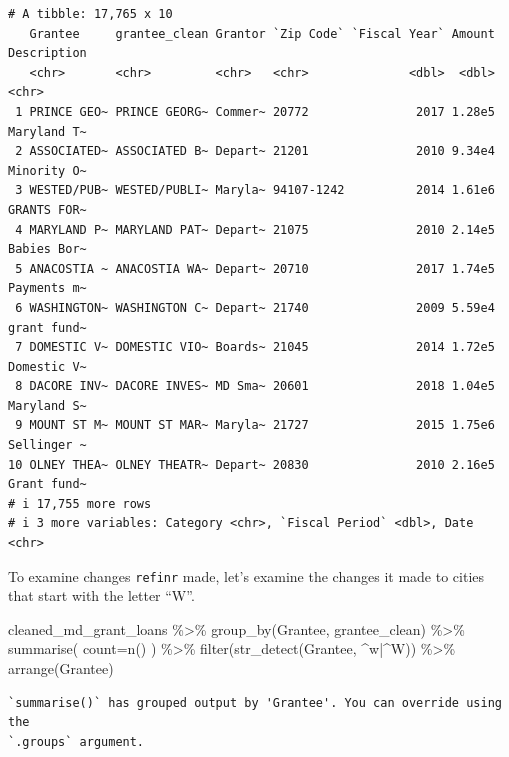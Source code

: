 \documentclass[
  letterpaper,
  DIV=11,
  numbers=noendperiod]{scrreprt}
\newenvironment{Shaded}{\begin{snugshade}}{\end{snugshade}}
\newcommand{\AttributeTok}[1]{\textcolor[rgb]{0.40,0.45,0.13}{#1}}
\newcommand{\FunctionTok}[1]{\textcolor[rgb]{0.28,0.35,0.67}{#1}}
\newcommand{\NormalTok}[1]{\textcolor[rgb]{0.00,0.23,0.31}{#1}}
\newcommand{\SpecialCharTok}[1]{\textcolor[rgb]{0.37,0.37,0.37}{#1}}
\newcommand{\StringTok}[1]{\textcolor[rgb]{0.13,0.47,0.30}{#1}}
\begin{document}
\begin{verbatim}
# A tibble: 17,765 x 10
   Grantee     grantee_clean Grantor `Zip Code` `Fiscal Year` Amount Description
   <chr>       <chr>         <chr>   <chr>              <dbl>  <dbl> <chr>      
 1 PRINCE GEO~ PRINCE GEORG~ Commer~ 20772               2017 1.28e5 Maryland T~
 2 ASSOCIATED~ ASSOCIATED B~ Depart~ 21201               2010 9.34e4 Minority O~
 3 WESTED/PUB~ WESTED/PUBLI~ Maryla~ 94107-1242          2014 1.61e6 GRANTS FOR~
 4 MARYLAND P~ MARYLAND PAT~ Depart~ 21075               2010 2.14e5 Babies Bor~
 5 ANACOSTIA ~ ANACOSTIA WA~ Depart~ 20710               2017 1.74e5 Payments m~
 6 WASHINGTON~ WASHINGTON C~ Depart~ 21740               2009 5.59e4 grant fund~
 7 DOMESTIC V~ DOMESTIC VIO~ Boards~ 21045               2014 1.72e5 Domestic V~
 8 DACORE INV~ DACORE INVES~ MD Sma~ 20601               2018 1.04e5 Maryland S~
 9 MOUNT ST M~ MOUNT ST MAR~ Maryla~ 21727               2015 1.75e6 Sellinger ~
10 OLNEY THEA~ OLNEY THEATR~ Depart~ 20830               2010 2.16e5 Grant fund~
# i 17,755 more rows
# i 3 more variables: Category <chr>, `Fiscal Period` <dbl>, Date <chr>
\end{verbatim}

To examine changes \texttt{refinr} made, let's examine the changes it
made to cities that start with the letter ``W''.

\begin{Shaded}
\begin{Highlighting}[]
\NormalTok{cleaned\_md\_grant\_loans }\SpecialCharTok{\%\textgreater{}\%}
  \FunctionTok{group\_by}\NormalTok{(Grantee, grantee\_clean) }\SpecialCharTok{\%\textgreater{}\%}
  \FunctionTok{summarise}\NormalTok{(}
    \AttributeTok{count=}\FunctionTok{n}\NormalTok{()}
\NormalTok{  ) }\SpecialCharTok{\%\textgreater{}\%}
  \FunctionTok{filter}\NormalTok{(}\FunctionTok{str\_detect}\NormalTok{(Grantee, }\StringTok{\textquotesingle{}\^{}w|\^{}W\textquotesingle{}}\NormalTok{)) }\SpecialCharTok{\%\textgreater{}\%}
  \FunctionTok{arrange}\NormalTok{(Grantee)}
\end{Highlighting}
\end{Shaded}

\begin{verbatim}
`summarise()` has grouped output by 'Grantee'. You can override using the
`.groups` argument.
\end{verbatim}
\end{document}
